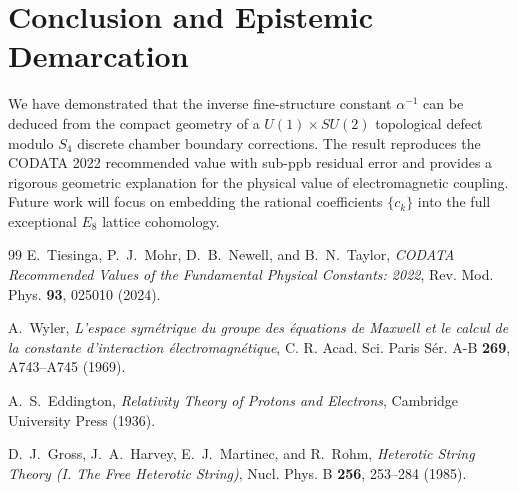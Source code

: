 \documentclass[11pt,a4paper]{article}
\begin{document}
\section{Conclusion and Epistemic Demarcation}
We have demonstrated that the inverse fine-structure constant $\alpha^{-1}$ can be deduced from the compact geometry of a $U(1) \times SU(2)$ topological defect modulo $S_4$ discrete chamber boundary corrections. The result reproduces the CODATA 2022 recommended value with sub-ppb residual error and provides a rigorous geometric explanation for the physical value of electromagnetic coupling. Future work will focus on embedding the rational coefficients $\{c_k\}$ into the full exceptional $E_8$ lattice cohomology.

\begin{thebibliography}{99}
E.~Tiesinga, P.~J.~Mohr, D.~B.~Newell, and B.~N.~Taylor,
\textit{CODATA Recommended Values of the Fundamental Physical Constants: 2022},
Rev. Mod. Phys. \textbf{93}, 025010 (2024).

A.~Wyler,
\textit{L'espace symétrique du groupe des équations de Maxwell et le calcul de la constante d'interaction électromagnétique},
C. R. Acad. Sci. Paris Sér. A-B \textbf{269}, A743--A745 (1969).

A.~S.~Eddington,
\textit{Relativity Theory of Protons and Electrons},
Cambridge University Press (1936).

D.~J.~Gross, J.~A.~Harvey, E.~J.~Martinec, and R.~Rohm,
\textit{Heterotic String Theory (I. The Free Heterotic String)},
Nucl. Phys. B \textbf{256}, 253--284 (1985).
\end{thebibliography}
\end{document}
